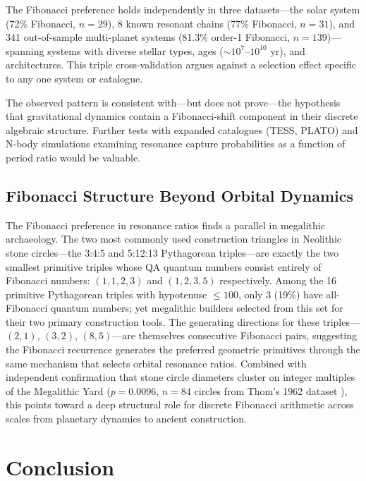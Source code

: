 \documentclass[twocolumn,11pt]{article}
\begin{document}
The Fibonacci preference holds independently in three datasets---the
solar system (72\% Fibonacci, $n = 29$), 8 known resonant chains
(77\% Fibonacci, $n = 31$), and 341 out-of-sample multi-planet
systems (81.3\% order-1 Fibonacci, $n = 139$)---spanning systems with
diverse stellar types, ages ($\sim 10^7$--$10^{10}$ yr), and
architectures.  This triple cross-validation argues against a
selection effect specific to any one system or catalogue.

The observed pattern is consistent with---but does not prove---the
hypothesis that gravitational dynamics contain a Fibonacci-shift
component in their discrete algebraic structure.  Further tests with
expanded catalogues (TESS, PLATO) and N-body simulations examining
resonance capture probabilities as a function of period ratio would
be valuable.

\subsection{Fibonacci Structure Beyond Orbital Dynamics}

The Fibonacci preference in resonance ratios finds a parallel in
megalithic archaeology.  The two most commonly used construction
triangles in Neolithic stone circles---the 3:4:5 and 5:12:13
Pythagorean triples---are exactly the two smallest primitive triples
whose QA quantum numbers consist entirely of Fibonacci numbers:
$(1,1,2,3)$ and $(1,2,3,5)$ respectively.  Among the 16 primitive
Pythagorean triples with hypotenuse $\leq 100$, only 3 (19\%) have
all-Fibonacci quantum numbers; yet megalithic builders selected from
this set for their two primary construction tools.  The generating
directions for these triples---$(2,1)$, $(3,2)$, $(8,5)$---are
themselves consecutive Fibonacci pairs, suggesting the Fibonacci
recurrence generates the preferred geometric primitives through the
same mechanism that selects orbital resonance ratios.  Combined with
independent confirmation that stone circle diameters cluster on
integer multiples of the Megalithic Yard ($p = 0.0096$, $n = 84$
circles from Thom's 1962 dataset \citep{thom1962}), this points
toward a deep structural role for discrete Fibonacci arithmetic
across scales from planetary dynamics to ancient construction.

\section{Conclusion}
\label{sec:conclusion}
\end{document}
